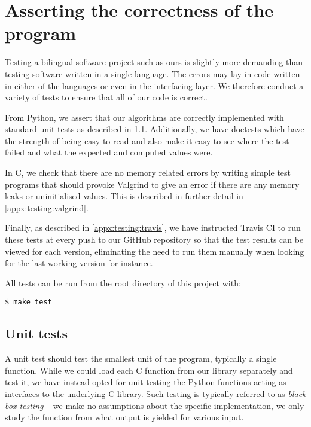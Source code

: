 \section{Asserting the correctness of the program}
\label{appx:testing}

Testing a bilingual software project such as ours is slightly more demanding than testing software written in a single language. The errors may lay in code written in either of the languages or even in the interfacing layer. We therefore conduct a variety of tests to ensure that all of our code is correct.

From Python, we assert that our algorithms are correctly implemented with standard unit tests as described in \ref{appx:testing:unit_tests}. Additionally, we have doctests which have the strength of being easy to read and also make it easy to see where the test failed and what the expected and computed values were.

In C, we check that there are no memory related errors by writing simple test programs that should provoke Valgrind to give an error if there are any memory leaks or uninitialised values. This is described in further detail in \ref{appx:testing:valgrind}.

Finally, as described in \ref{appx:testing:travis}, we have instructed Travis CI to run these tests at every push to our GitHub repository so that the test results can be viewed for each version, eliminating the need to run them manually when looking for the last working version for instance.

All tests can be run from the root directory of this project with:

\begin{verbatim}
$ make test
\end{verbatim}

\subsection{Unit tests}
\label{appx:testing:unit_tests}
A unit test should test the smallest unit of the program, typically a single function. While we could load each C function from our library separately and test it, we have instead opted for unit testing the Python functions acting as interfaces to the underlying C library. Such testing is typically referred to as \emph{black box testing} -- we make no assumptions about the specific implementation, we only study the function from what output is yielded for various input.

